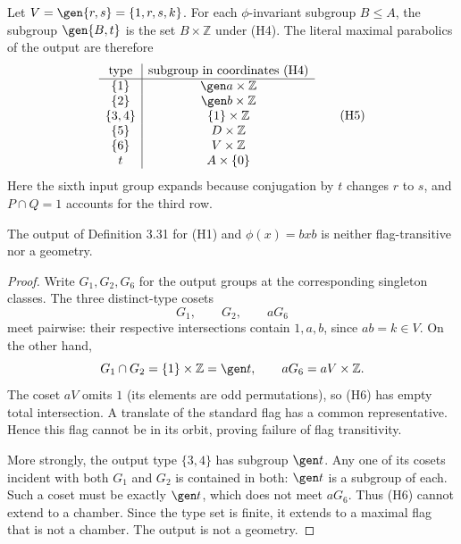 Let $V=\gen{r,s}=\{1,r,s,k\}$. For each $\phi$-invariant subgroup
$B\leq A$, the subgroup $\gen{B,t}$ is the set $B\times\mathbb Z$
under (H4). The literal maximal parabolics of the output are therefore
\[
\begin{array}{c|c}
\text{type}&\text{subgroup in coordinates (H4)}\\\hline
\{1\}&\gen a\times\mathbb Z\\
\{2\}&\gen b\times\mathbb Z\\
\{3,4\}&\{1\}\times\mathbb Z\\
\{5\}&D\times\mathbb Z\\
\{6\}&V\times\mathbb Z\\
t&A\times\{0\}
\end{array}                                                     \tag{H5}
\]
Here the sixth input group expands because conjugation by $t$ changes
$r$ to $s$, and $P\cap Q=1$ accounts for the third row.

\begin{theorem}
The output of Definition 3.31 for (H1) and $\phi(x)=bxb$ is neither
flag-transitive nor a geometry.
\end{theorem}
\begin{proof}
Write $G_1,G_2,G_6$ for the output groups at the corresponding singleton
classes. The three distinct-type cosets
\[
 G_1,\qquad G_2,\qquad aG_6                              \tag{H6}
\]
meet pairwise: their respective intersections contain $1,a,b$, since
$ab=k\in V$. On the other hand,
\[
 G_1\cap G_2=\{1\}\times\mathbb Z=\gen t,
 \qquad aG_6=aV\times\mathbb Z.
\]
The coset $aV$ omits $1$ (its elements are odd permutations), so (H6)
has empty total intersection. A translate of the standard flag has a
common representative. Hence this flag cannot be in its orbit, proving
failure of flag transitivity.

More strongly, the output type $\{3,4\}$ has subgroup $\gen t$.
Any one of its cosets incident with both $G_1$ and $G_2$ is contained
in both: $\gen t$ is a subgroup of each. Such a coset must be exactly
$\gen t$, which does not meet $aG_6$. Thus (H6) cannot extend to a
chamber. Since the type set is finite, it extends to a maximal flag
that is not a chamber. The output is not a geometry.
\end{proof}


